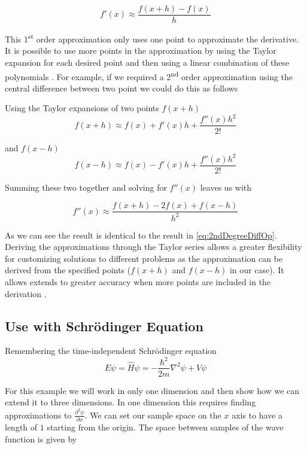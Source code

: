 \documentclass[authoryearcitations]{UoYCSproject}
\begin{document}
\begin{equation}
f'(x) \approx \frac{f(x + h) - f(x)}{h}
\label{eq:taylorForwardApprox}
\end{equation}

This 1\textsuperscript{st} order approximation only uses one point to approximate the derivative. It is possible to use more 
points in the approximation by using the Taylor expansion for each desired point and then using a linear combination of these
polynomials \cite{farlow}. For example, if we required a 2\textsuperscript{nd} order approximation 
using the central difference between two point we could do this as follows

Using the Taylor expansions of two points $f(x+h)$
$$f(x+h) \approx f(x) + f'(x)h+ \frac{f''(x)h^2}{2!}$$ 

and $f(x-h)$
$$f(x-h) \approx f(x) - f'(x)h+ \frac{f''(x)h^2}{2!}$$ 

Summing these two together and solving for $f''(x)$ leaves us with

\begin{equation}
f''(x) \approx \frac{f(x + h) - 2f(x) + f(x - h)}{h^2}
\label{eq:2ndDegreeTaylor}
\end{equation}

As we can see the result is identical to the result in \ref{eq:2ndDegreeDiffOp}. Deriving the approximations through
the Taylor series allows a greater flexibility for customizing solutions to different problems as the approximation
can be derived from the specified points ($f(x+h)$ and $f(x-h)$ in our case). It allows extends to greater accuracy when
more points are included in the derivation \cite{cambridge}.  

\subsection{Use with Schr\"{o}dinger Equation}
Remembering the time-independent Schr\"{o}dinger equation
\begin{equation}
E\psi = \hat{H}\psi = -\frac{\hbar ^2}{2m}\nabla ^2\psi + V\psi \nonumber
\end{equation}

For this example we will work in only one dimension and then show how we can extend it to three dimensions. 
In one dimension this requires finding approximations to $\frac{\partial ^2 \psi}{\partial x}$. We can set our
sample space on the $x$ axis to have a length of $1$ starting from the origin. The space between samples of the 
wave function is given by
\end{document}
